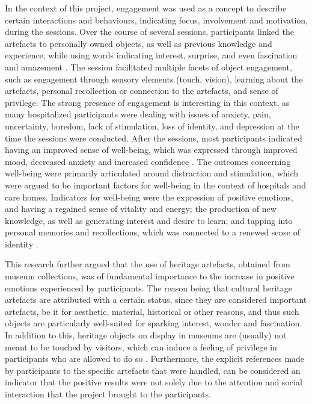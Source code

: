In the context of this project, engagement was used as a concept to describe certain
interactions and behaviours, indicating focus, involvement and motivation, 
during the sessions. Over the course of several sessions, participants 
linked the artefacts to personally owned objects, as well as previous knowledge 
and experience, while using words indicating interest, surprise, and even fascination 
and amazement \parencite[234]{AnderE_2013}. The session facilitated multiple facets of 
object engagement, such as engagement through sensory elements (touch, vision), 
learning about the artefacts, personal recollection or connection to the artefacts, 
and sense of privilege. The strong presence of engagement is interesting in this context, 
as many hospitalized participants were dealing with issues of anxiety, pain, uncertainty,
boredom, lack of stimulation, loss of identity, and depression at the time the sessions 
were conducted. After the sessions, most participants indicated having an improved sense 
of well-being, which was expressed through improved mood, decreased anxiety and increased
confidence \parencite[234--235]{AnderE_2013}. 
The outcomes concerning well-being were primarily articulated around distraction and
stimulation, which were argued to be important factors for well-being in the context of
hospitals and care homes. Indicators for well-being were the expression of positive 
emotions, and having a regained sense of vitality and energy; the production of new 
knowledge, as well as generating interest and desire to learn; and tapping into personal
memories and recollections, which was connected to a renewed sense of identity \parencite[235--236]{AnderE_2013}.
									
This research further argued that the use of heritage artefacts, obtained from museum
collections, was of fundamental importance to the increase in positive emotions experienced by participants. The reason being that cultural heritage artefacts are attributed with a certain status, since they are considered important artefacts, be it for aesthetic, material,
historical or other reasons, and thus such objects are particularly well-suited for sparking interest, wonder and fascination. In addition to this, heritage objects on display in museums are (usually) not meant to be touched by visitors, which can induce a feeling of privilege in participants who are allowed to do so \parencite[240]{AnderE_2013}. 
Furthermore, the explicit references made by participants to the specific artefacts that were handled, can be considered an indicator that the positive results were not solely due to the attention and social interaction that the project brought to the participants.	
	
